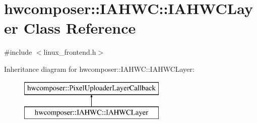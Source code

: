 \hypertarget{classhwcomposer_1_1IAHWC_1_1IAHWCLayer}{}\section{hwcomposer\+:\+:I\+A\+H\+WC\+:\+:I\+A\+H\+W\+C\+Layer Class Reference}
\label{classhwcomposer_1_1IAHWC_1_1IAHWCLayer}


{\ttfamily \#include $<$linux\+\_\+frontend.\+h$>$}

Inheritance diagram for hwcomposer\+:\+:I\+A\+H\+WC\+:\+:I\+A\+H\+W\+C\+Layer\+:\begin{figure}[H]
\begin{center}
\leavevmode
\includegraphics[height=2.000000cm]{classhwcomposer_1_1IAHWC_1_1IAHWCLayer}
\end{center}
\end{figure}
